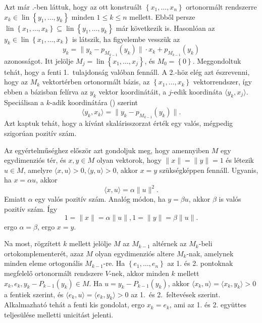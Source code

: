 \documentclass[a4paper, showtrims]{memoir}
\makeatletter
\renewenvironment{proof}[1][\proofname]
    {\par\pushQED{\qed}%
    \normalfont \topsep6\p@\@plus6\p@\relax
    \trivlist
    \item[\hskip\labelsep
        \itshape
    #1\@addpunct{:}]\ignorespaces}
    {\popQED\endtrivlist\@endpefalse}
\theoremstyle{plain}
\theoremstyle{remark}
\theoremstyle{definition}
\DeclareMathOperator{\lin}{lin}
\newcommand{\ip}[2]{\langle#1,#2\rangle}
\makeatother
\begin{document}
\begin{proof}
    Azt már \aazt{\ref{pr:GS}}.-ben láttuk, hogy az ott konstruált $\left\{ x_1,\dots,x_n \right\}$ ortonormált rendszerre
    $x_k\in\lin\left\{y_1,\dots,y_k  \right\}$ minden $1\leq k\leq n$ mellett.
    Ebből persze
    $\lin\left\{ x_1,\dots,x_k \right\}\subseteq\lin\left\{ y_1,\dots,y_k \right\}$ már következik is.
    Hasonlóan az $y_k\in\lin\left\{ x_1,\dots,x_k \right\}$ is látszik, 
    ha figyelembe vesszük az
    \[
        y_k
        =
        \|y_k-p_{M_{k-1}}(y_{k})\|\cdot x_k+p_{M_{k-1}}(y_k)
        \tag{\dag}
    \]
    azonosságot. 
    Itt jelölje $M_j=\lin\left\{ x_1,\dots,x_j \right\}$, és $M_0=\left\{ 0 \right\}$.
    Meggondoltuk tehát, hogy a fenti 1.~tulajdonság valóban fennáll.
    A 2.-höz elég azt észrevenni, hogy az $M_k$ vektortérben ortonormált bázis,
    az $\left\{ x_1,\dots,x_k \right\}$ vektorrendszer, 
    így ebben a bázisban felírva az $y_k$ vektor koordinátáit, a $j$-edik koordináta 
    $\ip{y_k}{x_j}$.
    Speciálisan a $k$-adik koordinátára (\dag) szerint
    \[
        \ip{y_k}{x_k}=
        \|y_k-p_{M_{k-1}}(y_{k})\|.
    \]
    Azt kaptuk tehát, hogy a kívánt skalárisszorzat érték egy valós, mégpedig szigorúan pozitív szám.

    Az egyértelműséghez először azt gondoljuk meg, hogy amennyiben $M$ egy egydimenziós tér,
    és $x,y\in M$ olyan vektorok, hogy $\|x\|=\|y\|=1$ és létezik $u\in M$, amelyre
    $\ip{x}{u}>0,\ip{y}{u}>0$, akkor $x=y$ szükségképpen fennáll.
    Ugyanis, ha $x=\alpha u$, akkor
    \[
        \ip{x}{u}
        =
        \alpha\|u\|^2.
    \]
    Emiatt $\alpha$ egy valós pozitív szám.
    Analóg módon, ha $y=\beta u$, akkor $\beta$ is valós pozitív szám.
    Így
    \[
        1=\|x\|=\alpha\|u\|,
        1=\|y\|=\beta\|u\|.
    \]
    ergo $\alpha=\beta$, ergo $x=y$.

    Na most, rögzített $k$ mellett jelölje $M$ az $M_{k-1}$ altérnek az $M_k$-beli ortokomplementerét, azaz
    $M$ olyan egydimenziós altere $M_k$-nak, amelynek minden eleme ortogonális $M_{k-1}$-re.
    Ha $\left\{ e_1,\dots,e_n \right\}$ az 1. és 2. pontoknak megfelelő ortonormált rendszere $V$-nek,
    akkor minden $k$ mellett $x_k,e_k,y_k-P_{k-1}(y_k)\in M$. 
    Ha $u=y_k-P_{k-1}(y_k)$, akkor 
    \(
      \ip{x_k}{u}=\ip{x_k}{y_k}>0
    \)
    a fentiek szerint, és
    \(
      \ip{e_k}{u}=\ip{e_k}{y_k}>0
    \)
    az 1.~és 2.~feltevések szerint. Alkalmazható tehát a fenti kis gondolat, ergo $x_k=e_k$,
    ami az 1. és 2. együttes teljesülése melletti unicitást jelenti.
\end{proof}
\end{document}

